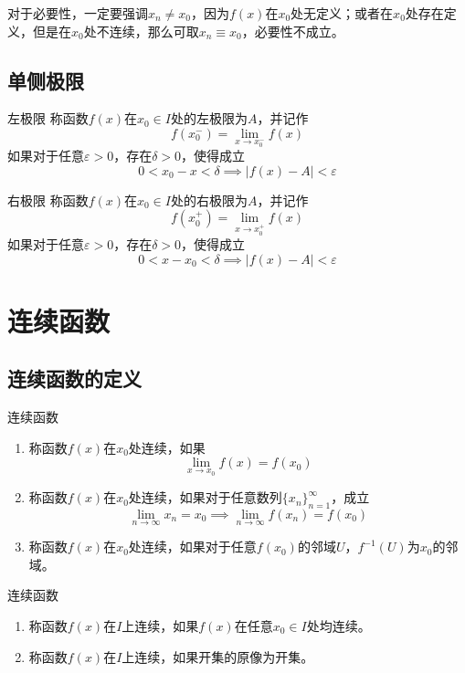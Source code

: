 \documentclass[lang = cn, scheme = chinese, thmcnt = section]{elegantbook}
\begin{document}
\begin{note}
	对于必要性，一定要强调$x_n\ne x_0$，因为$f(x)$在$x_0$处无定义；或者在$x_0$处存在定义，但是在$x_0$处不连续，那么可取$x_n\equiv x_0$，必要性不成立。
\end{note}

\subsection{单侧极限}

\begin{definition}{左极限}
	称函数$f(x)$在$x_0\in I$处的左极限为$A$，并记作
	$$
	f(x_0^-)=\lim_{x\to x_0^-}f(x)
	$$
	如果对于任意$\varepsilon>0$，存在$\delta>0$，使得成立
	$$
	0<x_0-x<\delta\implies
	|f(x)-A|<\varepsilon
	$$
\end{definition}

\begin{definition}{右极限}
	称函数$f(x)$在$x_0\in I$处的右极限为$A$，并记作
	$$
	f(x_0^+)=\lim_{x\to x_0^+}f(x)
	$$
	如果对于任意$\varepsilon>0$，存在$\delta>0$，使得成立
	$$
	0<x-x_0<\delta\implies
	|f(x)-A|<\varepsilon
	$$
\end{definition}

\section{连续函数}

\subsection{连续函数的定义}

\begin{definition}{连续函数}
	\begin{enumerate}
		\item 称函数$f(x)$在$x_0$处连续，如果
		$$
		\lim_{x\to x_0}f(x)=f(x_0)
		$$
		\item 称函数$f(x)$在$x_0$处连续，如果对于任意数列$\{ x_n \}_{n=1}^{\infty}$，成立
		$$
		\lim_{n\to \infty}x_n=x_0\implies
		\lim_{n\to \infty}f(x_n)=f(x_0)
		$$
		\item 称函数$f(x)$在$x_0$处连续，如果对于任意$f(x_0)$的邻域$U$，$f^{-1}(U)$为$x_0$的邻域。
	\end{enumerate}
\end{definition}

\begin{definition}{连续函数}
	\begin{enumerate}
		\item 称函数$f(x)$在$I$上连续，如果$f(x)$在任意$x_0\in I$处均连续。
		\item 称函数$f(x)$在$I$上连续，如果开集的原像为开集。
	\end{enumerate}
\end{definition}
\end{document}
